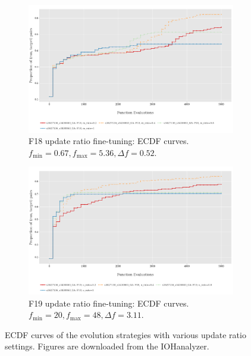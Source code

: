 \documentclass{article}
\begin{document}
\begin{figure}[!ht]
    \begin{subfigure}[h]{0.95\linewidth}
        \includegraphics[width=\linewidth]{ga/f18/urate_ecdf.png}
        \caption{F18 update ratio fine-tuning: ECDF curves. $f_{\min} = 0.67, f_{\max} = 5.36, \Delta f = 0.52$.}
    \end{subfigure}
    \hfill
    \begin{subfigure}[h]{0.95\linewidth}
        \includegraphics[width=\linewidth]{ga/f19/urate_ecdf.png}
        \caption{F19 update ratio fine-tuning: ECDF curves. $f_{\min} = 20, f_{\max} = 48, \Delta f = 3.11$.}
    \end{subfigure}
    \caption{ECDF curves of the evolution strategies with various update ratio settings. Figures are downloaded from the IOHanalyzer.}
    \label{fig:experi-ga-urate-ecdf}
\end{figure}
\end{document}
